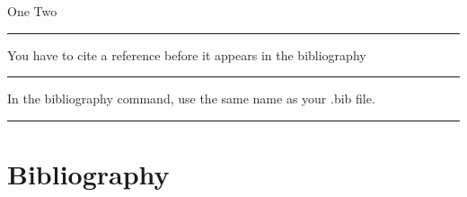 \documentclass[12pt]{article}
\newcommand{\inOut}[1]{#1}                                %
\begin{document}
    \begin{example} \label{expCite1}
    \inOut{One \cite{Aa01} Two \cite{LL01}}
    \end{example}\hrule

    \begin{remark} \label{remCite1}
        You have to cite a reference before it appears in the bibliography
    \end{remark}\hrule

    \begin{remark} \label{remCite2}
        In the bibliography command, use the same name as your .bib file.
    \end{remark}\hrule

    \section{Bibliography}\label{secBib}
    \newpage
    
\end{document}
